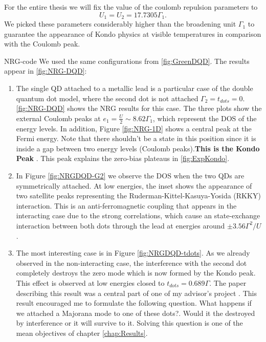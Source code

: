 For the entire thesis we will fix the value of the coulomb repulsion parameters to 
\begin{equation}
 U_1 = U_2 = 17.7305 \Gamma_1.
\end{equation}
\noindent We picked these parameters considerably higher than the broadening unit $\Gamma_1$ to guarantee the appearance of Kondo physics at visible temperatures in comparison with the Coulomb peak.  




 NRG-code  We used the same configurations from \ref{fig:GreenDQD}. The  results appear in \ref{fig:NRG-DQD}:

 \begin{enumerate}
 
\item The single QD attached to a metallic lead is a particular case of the double quantum dot model, where the second dot is not attached $\Gamma_2 = t_{dots}=0$.  \ref{fig:NRG-DQD} shows the NRG results for this case. The three plots show the external Coulomb peaks at $e_1 = \frac{U}{2} \sim 8.62\Gamma_1$, which represent the DOS of the energy levels. In addition,  Figure \ref{fig:NRG-1D} shows a central peak at the Fermi energy. Note that there shouldn't be a state in this position since it is inside a gap between two energy levels (Coulomb peaks).\textbf{This is the Kondo Peak} \cite{hewson_kondo_1997}. This peak explains the zero-bias plateaus in \ref{fig:ExpKondo}.  
\item 
In Figure \ref{fig:NRGDQD-G2} we observe the DOS when the two QDs are symmetrically attached.  At low energies, the inset shows the appearance of two satellite peaks representing the Ruderman-Kittel-Kasuya-Yosida (RKKY) interaction. This is an anti-ferromagnetic coupling that appears in the interacting case due to the strong correlations, which cause an state-exchange interaction between both dots through the lead at energies around $\pm 3.56\Gamma^2/U$ \cite{LIAO2015354}.

\item The most interesting case is in Figure \ref{fig:NRGDQD-tdots}. As we already observed in the non-interacting case, the interference with the second dot completely destroys the zero mode which is now formed by the Kondo peak. This effect is observed at low energies closed to $t_{dots}=0.689\Gamma$. The paper describing this result was a central part of one of my advisor's project \cite{dias_da_silva_transmission_2008}. This result encouraged me to formulate the following question. What happens if we attached a Majorana mode to one of these dots?. Would it the destroyed by interference or it will survive to it. Solving this question is one of the mean objectives of chapter \ref{chap:Results}. 
 \end{enumerate}

